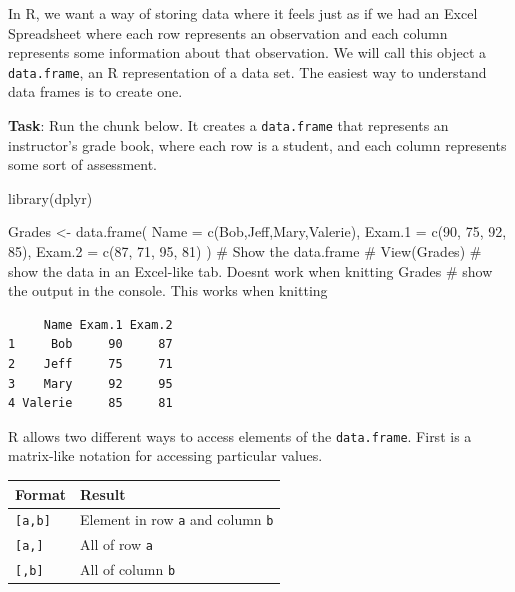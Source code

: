 \documentclass[
  letterpaper,
  DIV=11,
  numbers=noendperiod]{scrreprt}
\newenvironment{Shaded}{\begin{snugshade}}{\end{snugshade}}
\newcommand{\AttributeTok}[1]{\textcolor[rgb]{0.40,0.45,0.13}{#1}}
\newcommand{\CommentTok}[1]{\textcolor[rgb]{0.37,0.37,0.37}{#1}}
\newcommand{\DecValTok}[1]{\textcolor[rgb]{0.68,0.00,0.00}{#1}}
\newcommand{\FunctionTok}[1]{\textcolor[rgb]{0.28,0.35,0.67}{#1}}
\newcommand{\NormalTok}[1]{\textcolor[rgb]{0.00,0.23,0.31}{#1}}
\newcommand{\OtherTok}[1]{\textcolor[rgb]{0.00,0.23,0.31}{#1}}
\newcommand{\StringTok}[1]{\textcolor[rgb]{0.13,0.47,0.30}{#1}}
\newcounter{none} %
\begin{document}
In R, we want a way of storing data where it feels just as if we had an
Excel Spreadsheet where each row represents an observation and each
column represents some information about that observation. We will call
this object a \texttt{data.frame}, an R representation of a data set.
The easiest way to understand data frames is to create one.

\textbf{Task}: Run the chunk below. It creates a \texttt{data.frame}
that represents an instructor's grade book, where each row is a student,
and each column represents some sort of assessment.

\begin{Shaded}
\begin{Highlighting}[]
\FunctionTok{library}\NormalTok{(dplyr)}

\NormalTok{Grades }\OtherTok{\textless{}{-}} \FunctionTok{data.frame}\NormalTok{(}
  \AttributeTok{Name  =} \FunctionTok{c}\NormalTok{(}\StringTok{\textquotesingle{}Bob\textquotesingle{}}\NormalTok{,}\StringTok{\textquotesingle{}Jeff\textquotesingle{}}\NormalTok{,}\StringTok{\textquotesingle{}Mary\textquotesingle{}}\NormalTok{,}\StringTok{\textquotesingle{}Valerie\textquotesingle{}}\NormalTok{),     }
  \AttributeTok{Exam.1 =} \FunctionTok{c}\NormalTok{(}\DecValTok{90}\NormalTok{, }\DecValTok{75}\NormalTok{, }\DecValTok{92}\NormalTok{, }\DecValTok{85}\NormalTok{),}
  \AttributeTok{Exam.2 =} \FunctionTok{c}\NormalTok{(}\DecValTok{87}\NormalTok{, }\DecValTok{71}\NormalTok{, }\DecValTok{95}\NormalTok{, }\DecValTok{81}\NormalTok{)}
\NormalTok{)}
\CommentTok{\# Show the data.frame }
\CommentTok{\# View(Grades)  \# show the data in an Excel{-}like tab.  Doesn\textquotesingle{}t work when knitting }
\NormalTok{Grades          }\CommentTok{\# show the output in the console. This works when knitting}
\end{Highlighting}
\end{Shaded}

\begin{verbatim}
     Name Exam.1 Exam.2
1     Bob     90     87
2    Jeff     75     71
3    Mary     92     95
4 Valerie     85     81
\end{verbatim}

R allows two different ways to access elements of the
\texttt{data.frame}. First is a matrix-like notation for accessing
particular values.

{\def\LTcaptype{none} %
\begin{longtable}[]{@{}ll@{}}
\toprule\noalign{}
Format & Result \\
\midrule\noalign{}
\endhead
\bottomrule\noalign{}
\endlastfoot
\texttt{{[}a,b{]}} & Element in row \texttt{a} and column \texttt{b} \\
\texttt{{[}a,{]}} & All of row \texttt{a} \\
\texttt{{[},b{]}} & All of column \texttt{b} \\
\end{longtable}
}
\end{document}

